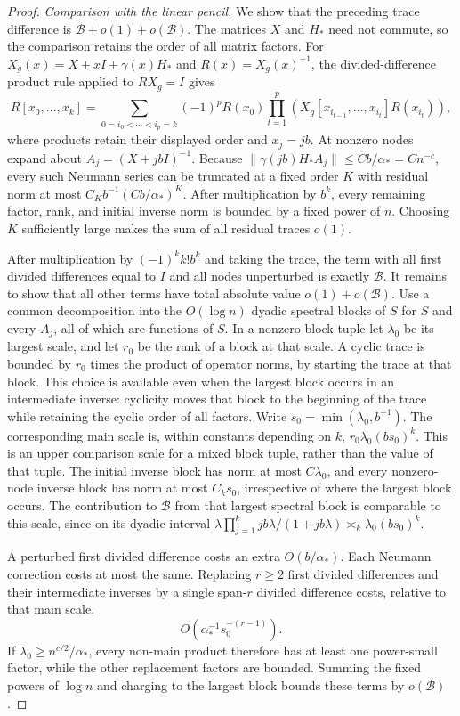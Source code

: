 \begin{proof}
\emph{Comparison with the linear pencil.}
We show that the preceding trace difference is
$\mathcal B+o(1)+o(\mathcal B)$. The matrices $X$ and $H_*$ need not
commute, so the comparison retains the order of all matrix factors. For
$X_g(x)=X+xI+\gamma(x)H_*$ and $R(x)=X_g(x)^{-1}$,
the divided-difference product rule applied to $RX_g=I$ gives
\[
 R[x_0,\ldots,x_k]
 =\sum_{0=i_0<\cdots<i_p=k}(-1)^p
 R(x_0)\prod_{t=1}^p
 \left(X_g[x_{i_{t-1}},\ldots,x_{i_t}]R(x_{i_t})\right),
\]
where products retain their displayed order and $x_j=jb$. At nonzero
nodes expand about $A_j=(X+jbI)^{-1}$. Because
$\|\gamma(jb)H_*A_j\|\le Cb/\alpha_*=Cn^{-c}$, every such Neumann
series can be truncated at a fixed order $K$ with residual norm
at most $C_Kb^{-1}(Cb/\alpha_*)^K$. After multiplication by $b^k$,
every remaining factor, rank, and initial inverse norm is bounded by
a fixed power of $n$. Choosing $K$ sufficiently large makes the sum
of all residual traces $o(1)$.

After multiplication by $(-1)^kk!b^k$ and taking the trace, the term
with all first divided differences equal to $I$ and all nodes
unperturbed is exactly $\mathcal B$. It remains to show that all other
terms have total absolute value $o(1)+o(\mathcal B)$.
Use a common decomposition into the $O(\log n)$ dyadic spectral
blocks of $S$ for $S$ and every $A_j$, all of which are functions
of $S$. In a nonzero block tuple let
$\lambda_0$ be its largest scale, and let $r_0$ be the rank of a
block at that scale. A cyclic trace is bounded by $r_0$ times the
product of operator norms, by starting the trace at that block.
This choice is available even when the largest block occurs in an
intermediate inverse: cyclicity moves that block to the beginning of
the trace while retaining the cyclic order of all factors.
Write $s_0=\min(\lambda_0,b^{-1})$. The corresponding main scale is,
within constants depending on $k$, $r_0\lambda_0(bs_0)^k$.
This is an upper comparison scale for a mixed block tuple, rather
than the value of that tuple. The initial inverse block has norm at
most $C\lambda_0$, and every nonzero-node inverse block has norm
at most $C_k s_0$, irrespective of where the largest block occurs.
The contribution to $\mathcal B$ from that largest spectral block
is comparable to this scale, since on its dyadic interval
$\lambda\prod_{j=1}^k jb\lambda/(1+jb\lambda)
\asymp_k\lambda_0(bs_0)^k$.

A perturbed first divided difference costs an extra
$O(b/\alpha_*)$. Each Neumann correction costs at most the same.
Replacing $r\ge2$ first divided differences and their intermediate
inverses by a single span-$r$ divided difference costs, relative to
that main scale,
\[
 O\left(\alpha_*^{-1}s_0^{-(r-1)}\right).
\]
If $\lambda_0\ge n^{c/2}/\alpha_*$, every non-main product therefore
has at least one power-small factor, while the other replacement
factors are bounded. Summing the fixed powers of $\log n$ and
charging to the largest block bounds these terms by $o(\mathcal B)$.


\end{proof}

